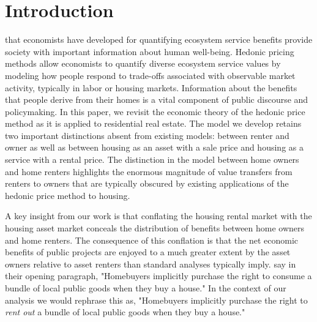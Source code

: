 \documentclass[ecta,nameyear,draft]{econsocart}
\theoremstyle{plain}
\theoremstyle{remark}
\begin{document}

\section{Introduction}
 that economists have developed for quantifying ecosystem service benefits provide society with important information about human well-being. Hedonic pricing methods allow economists to quantify diverse ecosystem service values by modeling how people respond to trade-offs associated with observable market activity, typically in labor or housing markets. Information about the benefits that people derive from their homes is a vital component of public discourse and policymaking. In this paper, we revisit the economic theory of the hedonic price method as it is applied to residential real estate. The model we develop retains two important distinctions absent from existing models: between renter and owner as well as between housing as an asset with a sale price and housing as a service with a rental price. The distinction in the model between home owners and home renters highlights the enormous magnitude of value transfers from renters to owners that are typically obscured by existing applications of the hedonic price method to housing.


A key insight from our work is that conflating the housing rental market with the housing asset market conceals the distribution of benefits between home owners and home renters. The consequence of this conflation is that the net economic benefits of public projects are enjoyed to a much greater extent by the asset owners relative to asset renters than standard analyses typically imply. \cite{kuminoffpope14} say in their opening paragraph, "Homebuyers implicitly purchase the right to consume a bundle of local public goods when they buy a house." In the context of our analysis we would rephrase this as, "Homebuyers implicitly purchase the right to \textit{rent out} a bundle of local public goods when they buy a house."
\end{document}
